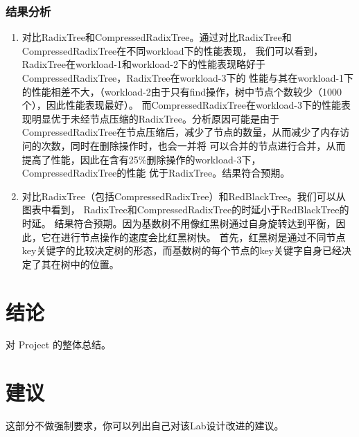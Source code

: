 \documentclass[]{article}
\begin{document}
\subsubsection{结果分析}
\begin{enumerate}
    \item 对比RadixTree和CompressedRadixTree。通过对比RadixTree和CompressedRadixTree在不同workload下的性能表现，
    我们可以看到，RadixTree在workload-1和workload-2下的性能表现略好于CompressedRadixTree，RadixTree在workload-3下的
    性能与其在workload-1下的性能相差不大，（workload-2由于只有find操作，树中节点个数较少（1000个），因此性能表现最好）。
    而CompressedRadixTree在workload-3下的性能表现明显优于未经节点压缩的RadixTree。分析原因可能是由于
    CompressedRadixTree在节点压缩后，减少了节点的数量，从而减少了内存访问的次数，同时在删除操作时，也会一并将
    可以合并的节点进行合并，从而提高了性能，因此在含有25\%删除操作的workload-3下，CompressedRadixTree的性能
    优于RadixTree。结果符合预期。
    \item 对比RadixTree（包括CompressedRadixTree）和RedBlackTree。我们可以从图表中看到，
    RadixTree和CompressedRadixTree的时延小于RedBlackTree的时延。
    结果符合预期。因为基数树不用像红黑树通过自身旋转达到平衡，因此，它在进行节点操作的速度会比红黑树快。
    首先，红黑树是通过不同节点key关键字的比较决定树的形态，而基数树的每个节点的key关键字自身已经决定了其在树中的位置。
\end{enumerate}

\section{结论}
对 Project 的整体总结。

\section{建议}
这部分不做强制要求，你可以列出自己对该Lab设计改进的建议。
\end{document}
